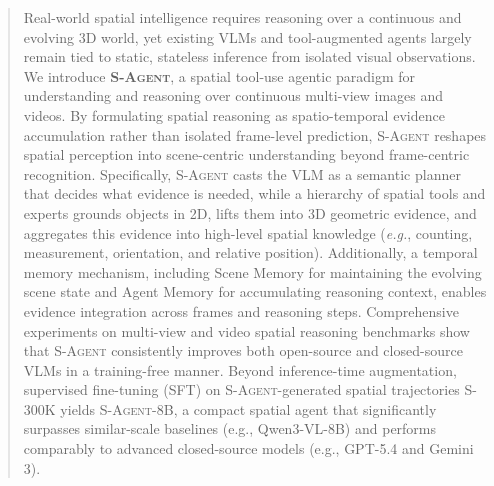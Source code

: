 \begin{abstract}
Real-world spatial intelligence requires reasoning over a continuous and evolving 3D world, yet existing VLMs and tool-augmented agents largely remain tied to static, stateless inference from isolated visual observations.
% 
We introduce \textbf{\textsc{S-Agent}}, a spatial tool-use agentic paradigm for understanding and reasoning over continuous multi-view images and videos. 
% 
By formulating spatial reasoning as spatio-temporal evidence accumulation rather than isolated frame-level prediction, \textsc{S-Agent} reshapes spatial perception into scene-centric understanding beyond frame-centric recognition.
% 
Specifically, \textsc{S-Agent} casts the VLM as a semantic planner that decides what evidence is needed, while a hierarchy of spatial tools and experts grounds objects in 2D, lifts them into 3D geometric evidence, and aggregates this evidence into high-level spatial knowledge (\textit{e.g.}, counting, measurement, orientation, and relative position). 
Additionally, a temporal memory mechanism, including Scene Memory for maintaining the evolving scene state and Agent Memory for accumulating reasoning context, enables evidence integration across frames and reasoning steps.
% 
Comprehensive experiments on multi-view and video spatial reasoning benchmarks show that \textsc{S-Agent} consistently improves both open-source and closed-source VLMs in a training-free manner. 
Beyond inference-time augmentation, supervised fine-tuning (SFT) on \textsc{S-Agent}-generated spatial trajectories \textsc{S-300K} yields \textsc{S-Agent-8B}, a compact spatial agent that significantly surpasses similar-scale baselines (e.g., Qwen3-VL-8B) and performs comparably to advanced closed-source models (e.g., GPT-5.4 and Gemini 3).

\end{abstract}


